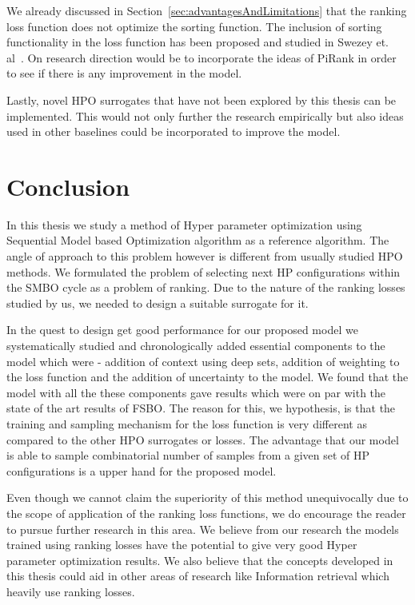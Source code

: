 \documentclass[12pt, twoside, ngerman]{report}
\begin{document}
We already discussed in Section~\ref{sec:advantagesAndLimitations}  that the ranking loss function does not optimize the sorting function.
The inclusion of sorting functionality in the loss function has  been proposed and studied in Swezey et.  al~\cite{PiRank}.
On research direction would be to incorporate the ideas of PiRank in order to see if there is any improvement in the model.

Lastly,  novel HPO surrogates that have not been explored by this thesis can be implemented.
This would not only further the research empirically but also ideas used in other baselines could be incorporated to improve the model.


\section{Conclusion}
In this thesis we study a method of Hyper parameter optimization using Sequential Model based Optimization algorithm as a reference algorithm.
The angle of approach to this problem however is different from usually studied HPO methods.
We formulated the problem of selecting next HP configurations within the SMBO cycle as a problem of ranking.
Due to the nature of the ranking losses studied by us,  we needed to design a suitable surrogate for it.

In the quest to design get good performance for our proposed model we systematically studied and chronologically added essential components to the model which were - addition of context using deep sets,  addition of weighting to the loss function and the addition of uncertainty to the model.
We found that the model with all the these components gave results which were on par with the state of the art results of FSBO.
The reason for this,  we hypothesis, is that the training and sampling mechanism for the loss function is very different as compared to the other HPO surrogates or losses.
The advantage that our model is able to sample combinatorial number of samples from a given set of HP configurations is a upper hand for the proposed model.

Even though we cannot claim the superiority of this method unequivocally due to the scope of application of the ranking loss functions,  we do encourage the reader to pursue further research in this area. 
We believe from our research the models trained using ranking losses have the potential to give very good Hyper parameter optimization results.
We also believe that the concepts developed in this thesis could aid in other areas of research like Information retrieval which heavily use ranking losses.
\end{document}
